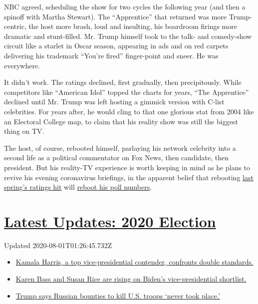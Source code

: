 NBC agreed, scheduling the show for two cycles the following year (and
then a spinoff with Martha Stewart). The ``Apprentice'' that returned
was more Trump-centric, the host more brash, loud and insulting, his
boardroom firings more dramatic and stunt-filled. Mr. Trump himself took
to the talk- and comedy-show circuit like a starlet in Oscar season,
appearing in ads and on red carpets delivering his trademark ``You're
fired'' finger-point and sneer. He was everywhere.

It didn't work. The ratings declined, first gradually, then
precipitously. While competitors like ``American Idol'' topped the
charts for years, ``The Apprentice'' declined until Mr. Trump was left
hosting a gimmick version with C-list celebrities. For years after, he
would cling to that one glorious stat from 2004 like an Electoral
College map, to claim that his reality show was still the biggest thing
on TV.

The host, of course, rebooted himself, parlaying his network celebrity
into a second life as a political commentator on Fox News, then
candidate, then president. But his reality-TV experience is worth
keeping in mind as he plans to revive his evening coronavirus briefings,
in the apparent belief that rebooting
\href{https://www.nytimes3xbfgragh.onion/2020/03/25/business/media/trump-coronavirus-briefings-ratings.html}{last
spring's ratings hit} will
\href{https://www.nytimes3xbfgragh.onion/2020/07/22/us/politics/trump-polls-2020.html}{reboot
his poll numbers}.

\hypertarget{latest-updates-2020-election}{%
\section{\texorpdfstring{\href{https://www.nytimes3xbfgragh.onion/2020/07/31/us/elections/biden-vs-trump.html?action=click\&pgtype=Article\&state=default\&region=MAIN_CONTENT_1\&context=storylines_live_updates}{Latest
Updates: 2020
Election}}{Latest Updates: 2020 Election}}\label{latest-updates-2020-election}}

Updated 2020-08-01T01:26:45.732Z

\begin{itemize}
\tightlist
\item
  \href{https://www.nytimes3xbfgragh.onion/2020/07/31/us/elections/biden-vs-trump.html?action=click\&pgtype=Article\&state=default\&region=MAIN_CONTENT_1\&context=storylines_live_updates\#link-29fdff45}{Kamala
  Harris, a top vice-presidential contender, confronts double
  standards.}
\item
  \href{https://www.nytimes3xbfgragh.onion/2020/07/31/us/elections/biden-vs-trump.html?action=click\&pgtype=Article\&state=default\&region=MAIN_CONTENT_1\&context=storylines_live_updates\#link-13ec3d9c}{Karen
  Bass and Susan Rice are rising on Biden's vice-presidential
  shortlist.}
\item
  \href{https://www.nytimes3xbfgragh.onion/2020/07/31/us/elections/biden-vs-trump.html?action=click\&pgtype=Article\&state=default\&region=MAIN_CONTENT_1\&context=storylines_live_updates\#link-49e9a016}{Trump
  says Russian bounties to kill U.S. troops `never took place.'}
\end{itemize}

